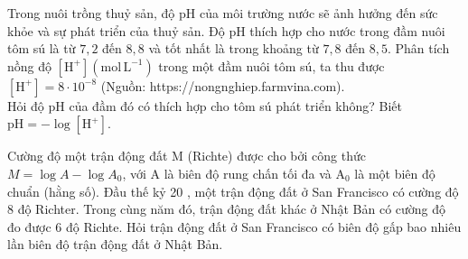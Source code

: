 \begin{baitap}%
	Trong nuôi trồng thuỷ sản, độ $\mathrm{pH}$ của môi trường nước sẽ ảnh hưởng đến sức khỏe và sự phát triển của thuỷ sản. Độ $\mathrm{pH}$ thích hợp cho nước trong đầm nuôi tôm sú là từ $7{,}2$ đến $8{,}8$ và tốt nhất là trong khoảng từ $7{,}8$ đến $8{,}5$. Phân tích nồng độ $\left[\mathrm{H}^{+}\right]\left(\mathrm{mol}\, \mathrm{L}^{-1}\right)$ trong một đầm nuôi tôm sú, ta thu được $\left[\mathrm{H}^{+}\right]=8\cdot10^{-8}$ (Nguồn: https://nongnghiep.farmvina.com). \\
	Hỏi độ $\mathrm{pH}$ của đầm đó có thích hợp cho tôm sú phát triển không? Biết $\mathrm{pH}=-\log \left[\mathrm{H}^{+}\right]$.
\end{baitap}	

\begin{baitap}
	Cường độ một trận động đất $\mathrm{M}$ (Richte) được cho bởi công thức $M=\log A-\log A_0$, với A là biên độ rung chấn tối đa và $\mathrm{A}_0$ là một biên độ chuẩn (hằng số). Đầu thế kỷ 20 , một trận động đất ở San Francisco có cường độ 8 độ Richter. Trong cùng năm đó, trận động đất khác ở Nhật Bản có cường độ đo được 6 độ Richte. Hỏi trận động đất ở San Francisco có biên độ gấp bao nhiêu lần biên độ trận động đất ở Nhật Bản.
\end{baitap}